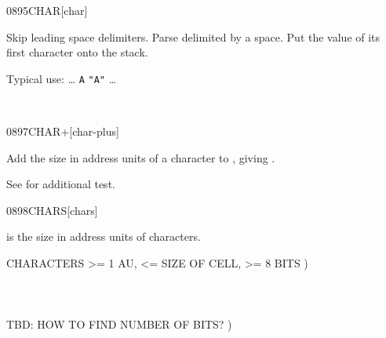 \enlargethispage{8ex}
\begin{worddef}{0895}{CHAR}[char]
\item {}

	Skip leading space delimiters. Parse  delimited by
	a space. Put the value of its first character onto the stack.


	\begin{rationale} %
		Typical use: {\ldots}
			 \texttt{A}  \texttt{"A"} {\ldots}
	\end{rationale}

	\begin{testing} %
		 \\
	\end{testing}
\end{worddef}


\begin{worddef}{0897}{CHAR+}[char-plus]
\item {}

	Add the size in address units of a character to
	, giving .


	\begin{testing} %

		See  for additional test.
	\end{testing}
\end{worddef}


\begin{worddef}{0898}{CHARS}[chars]
\item {}

	 is the size in address units of 
	characters.

	\begin{testing} %
		\ttfamily
		 CHARACTERS >= 1 AU, <= SIZE OF CELL, >= 8 BITS ) \\
		 \\
		 \\
		 \\
		 TBD: HOW TO FIND NUMBER OF BITS? )
	\end{testing}
\end{worddef}


